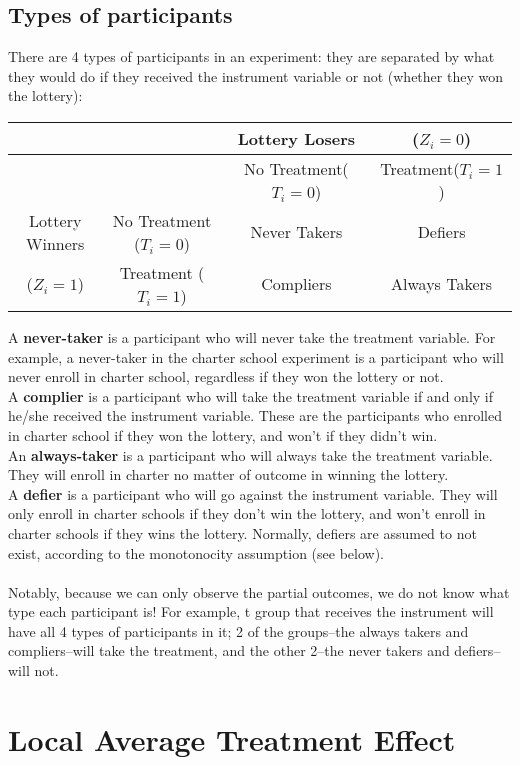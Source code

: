 \documentclass{article}
\begin{document}
\subsection{Types of participants}
There are 4 types of participants in an experiment: they are separated by what they would do if they received the instrument variable or not (whether they won the lottery):
\begin{center}
    \begin{tabular}{c|ccc}
        &&Lottery Losers&($Z_i = 0$) \\ 
        \hline
         & &No Treatment($T_i=0$)&Treatment($T_i=1$) \\
         Lottery Winners &No Treatment ($T_i=0$)&Never Takers&Defiers  \\
         ($Z_i = 1$) &Treatment ($T_i=1$)&Compliers&Always Takers \\
    \end{tabular}
\end{center}
A \textbf{never-taker} is a participant who will never take the treatment variable.
For example, a never-taker in the charter school experiment is a participant who will never enroll in charter school, regardless if they won the lottery or not.
\\
A \textbf{complier} is a participant who will take the treatment variable if and only if he/she received the instrument variable. 
These are the participants who enrolled in charter school if they won the lottery, and won't if they didn't win.
\\
An \textbf{always-taker} is a participant who will always take the treatment variable.
They will enroll in charter no matter of outcome in winning the lottery.
\\
A \textbf{defier} is a participant who will go against the instrument variable. 
They will only enroll in charter schools if they don't win the lottery, and won't enroll in charter schools if they wins the lottery.
Normally, defiers are assumed to not exist, according to the monotonocity assumption (see below). 
\\\\
Notably, because we can only observe the partial outcomes, we do not know what type each participant is! 
For example, t group that receives the instrument will have all 4 types of participants in it; 2 of the groups–the always takers and compliers–will take the treatment, and the other 2–the never takers and defiers–will not.

\section{Local Average Treatment Effect}
\end{document}
